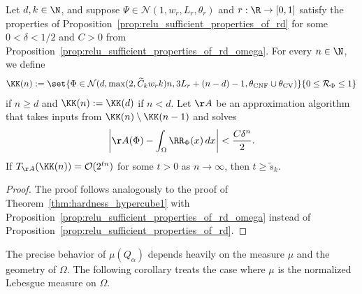 \documentclass{amsart}[11pt]
\numberwithin{equation}{section}
\newcommand{\nn}{\mathcal{N}}
\newcommand{\realization}{\mathcal{R}}
\newcommand{\order}{\mathcal{O}}
\newcommand{\worstTime}{T}
\numberwithin{theorem}{section}
\begin{document}
\begin{theorem}\label{thm:hardness_general} 
    Let $d, k\in \N$, and suppose $\Psi \in \nn(1, w_r, L_r, \theta_r)$ and $r: \R \to [0, 1]$ satisfy the properties of Proposition~\ref{prop:relu_sufficient_properties_of_rd} for some $0 < \delta < 1/2$ and $C > 0$ from Proposition~\ref{prop:relu_sufficient_properties_of_rd_omega}. For every $n \in \N$, we define
    \begin{align*}
        \KK(n) := \set{ \Phi \in \nn(d, \max(2, \widetilde C_k w_r k)n, 3L_r + (n - d) - 1, \theta_{\rm{CNF}} \cup \theta_{\rm CV})}{0 \leq \realization_\Phi  \leq 1}
    \end{align*}
    if $n \geq d$ and $\KK(n) := \KK(d)$ if $n < d$. Let $\AA$ be an approximation algorithm that takes inputs from $\KK(n)\setminus\KK(n-1)$ and solves
    \begin{align*}
        \left|\AA(\Phi) - \int_{\Omega} \RR_\Phi(x) \, dx\right| < \frac{C \delta^n}{2}.
    \end{align*}
     If $\worstTime_{\AA}(\KK(n)) = \order(2^{tn})$ for some $t>0$ as $n \to \infty$, then $t \geq \widetilde s_k$.
\end{theorem}
\begin{proof}
    The proof follows analogously to the proof of Theorem~\ref{thm:hardness_hypercube1} with Proposition~\ref{prop:relu_sufficient_properties_of_rd_omega} instead of Proposition~\ref{prop:relu_sufficient_properties_of_rd}.
\end{proof}

The precise behavior of $\mu(Q_\alpha)$ depends heavily on the measure $\mu$ and the geometry of $\Omega$. The following corollary treats the case where $\mu$ is the normalized Lebesgue measure on $\Omega$.
\end{document}
